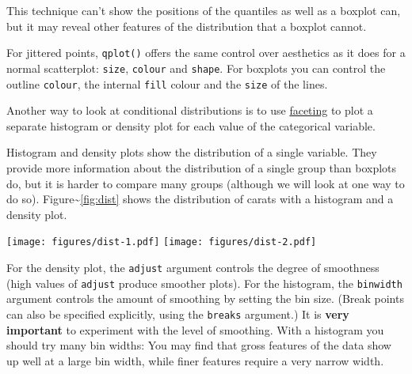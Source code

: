 This technique can't show the positions of the quantiles as well as a
boxplot can, but it may reveal other features of the distribution that a
boxplot cannot.

For jittered points, \texttt{qplot()} offers the same control over
aesthetics as it does for a normal scatterplot: \texttt{size},
\texttt{colour} and \texttt{shape}. For boxplots you can control the
outline \texttt{colour}, the internal \texttt{fill} colour and the
\texttt{size} of the lines.

Another way to look at conditional distributions is to use
\hyperref[sec:qplot-faceting]{faceting} to plot a separate histogram or
density plot for each value of the categorical variable.


Histogram and density plots show the distribution of a single variable.
They provide more information about the distribution of a single group
than boxplots do, but it is harder to compare many groups (although we
will look at one way to do so). Figure\textasciitilde{}\ref{fig:dist}
shows the distribution of carats with a histogram and a density plot.
  

\begin{Shaded}
\begin{Highlighting}[]
  \NormalTok{)}
  \NormalTok{)}
\end{Highlighting}
\end{Shaded}

\texttt{[image: figures/dist-1.pdf]}
\texttt{[image: figures/dist-2.pdf]}

For the density plot, the \texttt{adjust} argument controls the degree
of smoothness (high values of \texttt{adjust} produce smoother plots).
For the histogram, the \texttt{binwidth} argument controls the amount of
smoothing by setting the bin size. (Break points can also be specified
explicitly, using the \texttt{breaks} argument.) It is \textbf{very
important} to experiment with the level of smoothing. With a histogram
you should try many bin widths: You may find that gross features of the
data show up well at a large bin width, while finer features require a
very narrow width.

